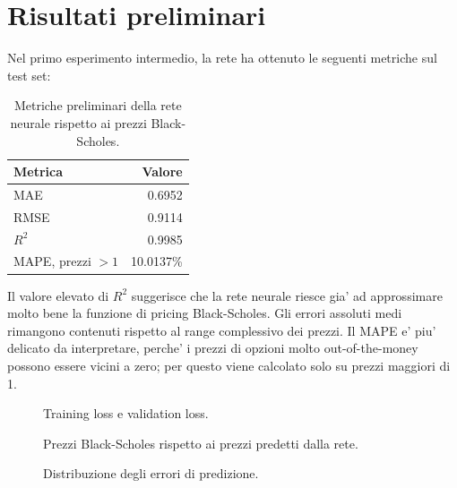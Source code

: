 \section{Risultati preliminari}

Nel primo esperimento intermedio, la rete ha ottenuto le seguenti metriche sul test set:

\begin{table}[H]
    \centering
    \begin{tabular}{lr}
        \toprule
        Metrica & Valore \\
        \midrule
        MAE & 0.6952 \\
        RMSE & 0.9114 \\
        $R^2$ & 0.9985 \\
        MAPE, prezzi $> 1$ & 10.0137\% \\
        \bottomrule
    \end{tabular}
    \caption{Metriche preliminari della rete neurale rispetto ai prezzi Black-Scholes.}
\end{table}

Il valore elevato di $R^2$ suggerisce che la rete neurale riesce gia' ad approssimare molto bene la funzione di pricing Black-Scholes.
Gli errori assoluti medi rimangono contenuti rispetto al range complessivo dei prezzi.
Il MAPE e' piu' delicato da interpretare, perche' i prezzi di opzioni molto out-of-the-money possono essere vicini a zero; per questo viene calcolato solo su prezzi maggiori di 1.

\begin{figure}[H]
    \centering
    \caption{Training loss e validation loss.}
\end{figure}

\begin{figure}[H]
    \centering
    \caption{Prezzi Black-Scholes rispetto ai prezzi predetti dalla rete.}
\end{figure}

\begin{figure}[H]
    \centering
    \caption{Distribuzione degli errori di predizione.}
\end{figure}

